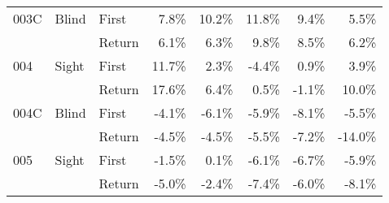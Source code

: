 \begin{table}[!htb]
\begin{tabular}{lllrrrrr}
003C & Blind & First &    7.8\% &   10.2\% &                                                11.8\% &                                                  9.4\% &    5.5\% \\
    &       & Return &    6.1\% &    6.3\% &                                                 9.8\% &                                                  8.5\% &    6.2\% \\
004 & Sight & First &   11.7\% &    2.3\% &                                                -4.4\% &                                                  0.9\% &    3.9\% \\
    &       & Return &   17.6\% &    6.4\% &                                                 0.5\% &                                                 -1.1\% &   10.0\% \\
004C & Blind & First &   -4.1\% &   -6.1\% &                                                -5.9\% &                                                 -8.1\% &   -5.5\% \\
    &       & Return &   -4.5\% &   -4.5\% &                                                -5.5\% &                                                 -7.2\% &  -14.0\% \\
005 & Sight & First &   -1.5\% &    0.1\% &                                                -6.1\% &                                                 -6.7\% &   -5.9\% \\
    &       & Return &   -5.0\% &   -2.4\% &                                                -7.4\% &                                                 -6.0\% &   -8.1\% \\
\bottomrule
\end{tabular}
\end{table}

